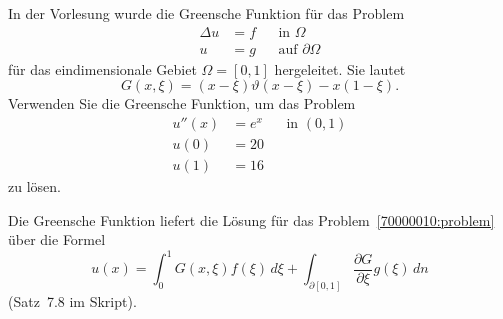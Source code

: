 In der Vorlesung wurde die Greensche Funktion für das Problem
\[
\begin{aligned}
\Delta u&= f & &\text{in $\Omega$}\\
       u&= g & &\text{auf $\partial\Omega$}
\end{aligned}
\]
für das eindimensionale Gebiet  $\Omega=[0,1]$ hergeleitet.
Sie lautet 
\[
G(x,\xi) = (x-\xi)\vartheta(x-\xi) -x(1-\xi).
\]
Verwenden Sie die Greensche Funktion, um das Problem
\[
\begin{aligned}
u''(x)& = e^x& &\text{in $(0,1)$}\\
  u(0)& =  20& &\\
  u(1)& =  16& &
\end{aligned}
\label{70000010:problem}
\]
zu lösen.

\begin{loesung}
Die Greensche Funktion liefert die Lösung für das
Problem~\eqref{70000010:problem} über die Formel
\begin{equation}
u(x)
=
\int_0^1 G(x,\xi) f(\xi)\,d\xi
+
\int_{\partial[0,1]}\frac{\partial G}{\partial \xi} g(\xi)\,dn
\label{70000010:green}
\end{equation}
(Satz~7.8 im Skript). 


\end{loesung}
